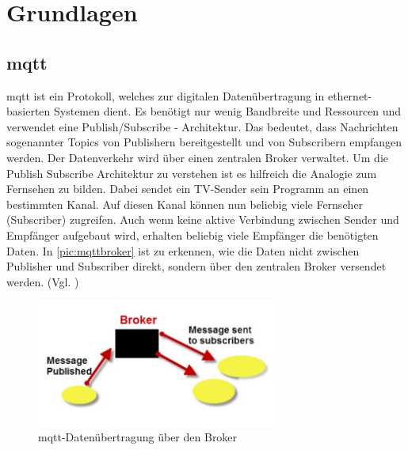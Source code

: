 \chapter{Grundlagen}

\section{\acrfull{mqtt}}
\acrshort{mqtt} ist ein Protokoll, welches zur digitalen Datenübertragung in ethernet-basierten Systemen dient. Es benötigt nur wenig Bandbreite und Ressourcen und verwendet eine 
Publish/Subscribe - Architektur. Das bedeutet, dass Nachrichten sogenannter Topics von Publishern bereitgestellt und von Subscribern empfangen werden. Der Datenverkehr wird über einen 
zentralen Broker verwaltet. Um die Publish Subscribe Architektur zu verstehen ist es hilfreich die Analogie zum Fernsehen zu bilden. Dabei sendet ein TV-Sender sein Programm an einen bestimmten Kanal.
Auf diesen Kanal können nun beliebig viele Fernseher (Subscriber) zugreifen. Auch wenn keine aktive Verbindung zwischen Sender und Empfänger aufgebaut wird, erhalten beliebig viele Empfänger die benötigten Daten.
In \autoref{pic:mqttbroker} ist zu erkennen, wie die Daten nicht zwischen Publisher und Subscriber direkt, sondern über den zentralen Broker versendet werden. (Vgl. \cite{mqtt})

\begin{figure}[h]
    \begin{center}
        \includegraphics[width=8cm]{mqttbroker.png}
        \caption{\acrshort{mqtt}-Datenübertragung über den Broker}
        \label{pic:mqttbroker}
    \end{center}
\end{figure}